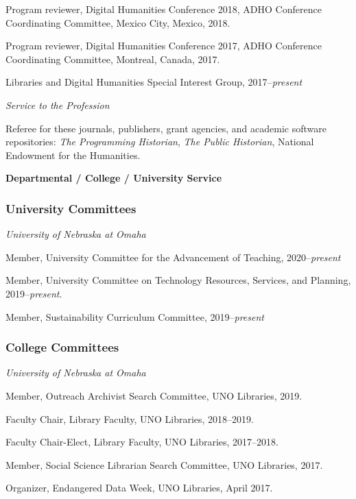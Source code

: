 Program reviewer, Digital Humanities Conference 2018, ADHO Conference
Coordinating Committee, Mexico City, Mexico, 2018.

Program reviewer, Digital Humanities Conference 2017, ADHO Conference
Coordinating Committee, Montreal, Canada, 2017.

Libraries and Digital Humanities Special Interest Group,
2017--\emph{present}

\vspace{.4cm}

\emph{Service to the Profession}

Referee for these journals, publishers, grant agencies, and academic
software repositories: \emph{The Programming Historian}, \emph{The
Public Historian}, National Endowment for the Humanities.

\vspace{.4cm}

\textbf{Departmental / College / University Service}

\subsubsection{University Committees}\label{university-committees}

\emph{University of Nebraska at Omaha}

Member, University Committee for the Advancement of Teaching,
2020--\emph{present}

Member, University Committee on Technology Resources, Services, and
Planning, 2019--\emph{present}.

Member, Sustainability Curriculum Committee, 2019--\emph{present}

\subsubsection{College Committees}\label{college-committees}

\emph{University of Nebraska at Omaha}

Member, Outreach Archivist Search Committee, UNO Libraries, 2019.

Faculty Chair, Library Faculty, UNO Libraries, 2018--2019.

Faculty Chair-Elect, Library Faculty, UNO Libraries, 2017--2018.

Member, Social Science Librarian Search Committee, UNO Libraries, 2017.

Organizer, Endangered Data Week, UNO Libraries, April 2017.

